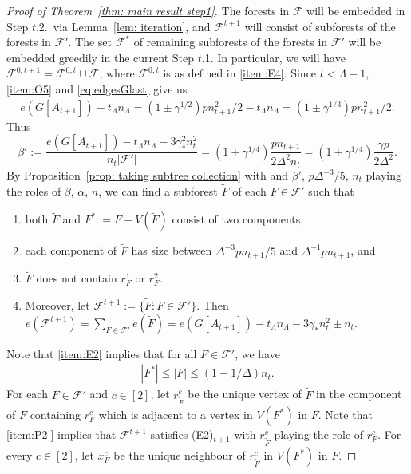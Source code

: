 \documentclass[a4paper, 11pt, reqno]{amsart}
\numberwithin{equation}{section}
\newcommand{\1}{{\rm 1\hspace*{-0.4ex}%
\rule{0.1ex}{1.52ex}\hspace*{0.2ex}}}
\newcommand{\cF}{\mathcal{F}}
\newcommand{\COMMENT}[1]{}
\newcounter{step}
\begin{document}
\begin{proof}[Proof of Theorem~\ref{thm: main result step1}]
The forests in $\cF$ will be embedded in {Step $t$.2.}~via Lemma~\ref{lem: iteration},
and $\cF^{t+1}$ will consist of subforests of the forests in $\cF'$.
The set $\cF^*$ of remaining subforests of the forests in $\cF'$ will be embedded greedily in the current Step $t$.1.
In particular, we will have $\cF^{0,t+1}=\cF^{0,t}\cup \cF$,
where $\cF^{0,t}$ is as defined in \ref{item:E4}.
Since $t<\Lambda-1$, 
\ref{item:O5} and \eqref{eq:edgesGlast} give us
\begin{align*}
 e(G[A_{t+1}]) - t_{\Lambda} n_{\Lambda} = (1\pm \gamma^{1/2}){pn_{t+1}^2}/{2} - t_{\Lambda} n_{\Lambda}= (1\pm \gamma^{1/3}) p n_{t+1}^2/2.
\end{align*}
Thus 
$$\beta':=\frac{ e(G[A_{t+1}]) - t_{\Lambda}n_{\Lambda} - 3\gamma_*^2 n_t^2}{n_t|\cF'|} 
= (1\pm \gamma^{1/4})\frac{p  n_{t+1}}{2\Delta^2n_t}
=(1\pm \gamma^{1/4})\frac{\gamma p}{2\Delta^{2}}.
$$
By Proposition~\ref{prop: taking subtree collection} with
and $\beta'$, $p\Delta^{-3}/5$, $n_t$ playing the roles of $\beta$, $\alpha$, $n$,\COMMENT{
So the previous display shows $\beta'\ll \alpha$.}
we can find a subforest $\tilde{F}$ of each $F\in \cF'$ such that 
\begin{enumerate}[label=(P\arabic*)]
	\item\label{item:P1'} both $\tilde{F}$ and $F^*:=F- V(\tilde{F})$ consist of two components,
	\item\label{item:P2'} each component of $\tilde{F}$ has size between $\Delta^{-3} p n_{t+1}/5$ and $\Delta^{-1}pn_{t+1}$, and
	\item\label{item:P3'}  $\tilde{F}$ does not contain $r^{1}_{F}$ or $r^{2}_{F}$.
	\item\label{item:P4'} Moreover, let $\cF^{t+1}:=\{ \tilde{F} : F\in \cF'\}$. Then
$e(\cF^{t+1})=\sum_{F \in \cF'} e(\tilde{F}) = e(G[A_{t+1}]) - t_{\Lambda}n_{\Lambda} - 3\gamma_* n_t^2 \pm n_t$.
\end{enumerate}
Note that \ref{item:E2} implies that for all $F\in \cF'$, we have
\begin{align}\label{eq:sizeF*}
	|F^*|\leq |F| \leq (1- 1/\Delta)n_t.
\end{align}
For each $F\in \cF'$ and $c\in [2]$, 
let $r^{c}_{\tilde{F}}$  be the unique vertex of $\tilde{F}$ in the component of $F$ containing $r_F^c$  
which is adjacent to a vertex in $V(F^{*})$ in $F$.
Note that \ref{item:P2'} implies that $\cF^{t+1}$ satisfies (E2)$_{t+1}$ with $r_{\tilde{F}}^c$ playing the role of $r_{F}^c$.
For every $c\in [2]$, let $x^{c}_{F}$ be the unique neighbour of $r_{\tilde{F}}^c$ in $V(F^{*})$ in $F$. 


\end{proof}
\end{document}
